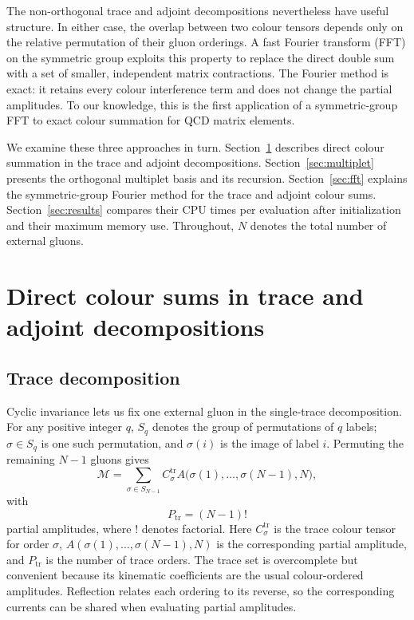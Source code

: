 \documentclass[aps,prd,twocolumn,superscriptaddress,nofootinbib]{revtex4-2}
\begin{document}
The non-orthogonal trace and adjoint decompositions nevertheless have useful
structure.  In either case, the overlap between two colour tensors depends
only on the relative permutation of their gluon orderings.  A fast Fourier
transform (FFT) on the symmetric group exploits this property to replace the
direct double sum with a set of smaller, independent matrix contractions.
The Fourier method is exact: it retains every colour interference term and
does not change the partial amplitudes.  To our knowledge, this is the first
application of a symmetric-group FFT to exact colour summation for QCD matrix
elements.

We examine these three approaches in turn.  Section~\ref{sec:direct}
describes direct colour summation in the trace and adjoint decompositions.
Section~\ref{sec:multiplet} presents the orthogonal multiplet basis and its
recursion.  Section~\ref{sec:fft} explains the symmetric-group Fourier method
for the trace and adjoint colour sums.  Section~\ref{sec:results} compares
their CPU times per evaluation after initialization and their maximum memory
use.  Throughout, $N$ denotes the total number of external gluons.

\section{Direct colour sums in trace and adjoint decompositions}
\label{sec:direct}

\subsection{Trace decomposition}

Cyclic invariance lets us fix one external gluon in the single-trace
decomposition.  For any positive integer $q$, $S_q$ denotes the group of
permutations of $q$ labels; $\sigma\in S_q$ is one such permutation, and
$\sigma(i)$ is the image of label $i$.  Permuting the remaining $N-1$ gluons
gives
\begin{equation}
  \mathcal M
  =\sum_{\sigma\in S_{N-1}}
   C^{\mathrm{tr}}_{\sigma}
   A\bigl(\sigma(1),\ldots,\sigma(N-1),N\bigr),
  \label{eq:trace-decomposition}
\end{equation}
with
\begin{equation}
  P_{\mathrm{tr}}=(N-1)!
  \label{eq:trace-size}
\end{equation}
partial amplitudes, where $!$ denotes factorial.  Here
$C^{\mathrm{tr}}_\sigma$ is the trace colour tensor for order $\sigma$,
$A(\sigma(1),\ldots,\sigma(N-1),N)$ is the corresponding partial amplitude,
and $P_{\mathrm{tr}}$ is the number of trace orders.  The trace set is
overcomplete but convenient because its kinematic coefficients are the usual
colour-ordered amplitudes.  Reflection relates each ordering to its reverse,
so the corresponding currents can be shared when evaluating partial
amplitudes.
\end{document}
